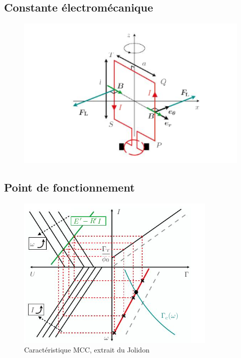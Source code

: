 \documentclass[10pt]{beamer}
\begin{document}
\subsection{Constante électromécanique}
\begin{frame}{\insertsubsection}
    \begin{figure}
        \centering
        \includegraphics[width=1\textwidth]{SchemaPrincipe.png}
    \end{figure}
\end{frame}

\subsection{Point de fonctionnement}

\begin{frame}{\insertsubsection}
\begin{figure}[ht]
	\centering
	\includegraphics[width=.5\textwidth]{CaracteristiqueMCCPointDeFonctionnement.png}
	\caption{Caractéristique MCC, extrait du Jolidon}
\end{figure}
\end{frame}
\end{document}
